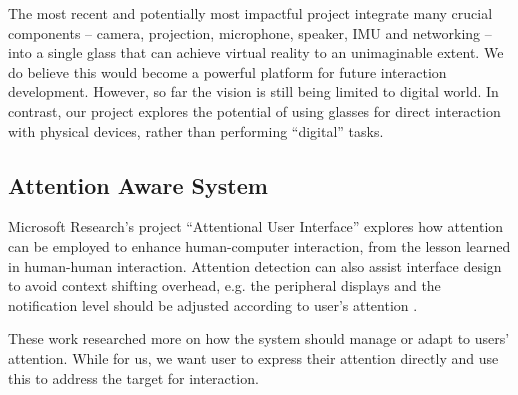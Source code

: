 The most recent and potentially most impactful project \cite{GoogleGlass} integrate many crucial components -- camera, projection, microphone, speaker, IMU and networking -- into a single glass that can achieve virtual reality to an unimaginable extent. We do believe this would become a powerful platform for future interaction development. However, so far the vision is still being limited to digital world. In contrast, our project explores the potential of using glasses for direct interaction with physical devices, rather than performing ``digital'' tasks.

\subsection{Attention Aware System}
\label{sec:attent-aware-syst}

Microsoft Research's project ``Attentional User Interface'' \cite{horvitz2003models} explores how attention can be employed to enhance human-computer interaction, from the lesson learned in human-human interaction. Attention detection can also assist interface design to avoid context shifting overhead, e.g. the peripheral displays and the notification level should be adjusted according to user's attention \cite{parkdesigning}. 

These work researched more on how the system should manage or adapt to users' attention. While for us, we want user to express their attention directly and use this to address the target for interaction.

